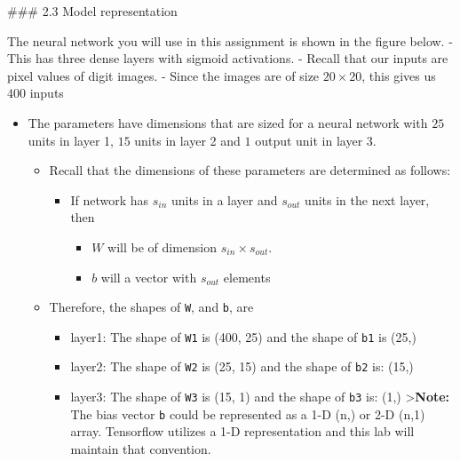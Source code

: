 \documentclass[11pt]{article}
\providecommand{\tightlist}{%
      \setlength{\itemsep}{0pt}\setlength{\parskip}{0pt}}
\begin{document}
    \#\#\# 2.3 Model representation

The neural network you will use in this assignment is shown in the
figure below. - This has three dense layers with sigmoid activations. -
Recall that our inputs are pixel values of digit images. - Since the
images are of size \(20\times20\), this gives us \(400\) inputs

    \begin{itemize}
\item
  The parameters have dimensions that are sized for a neural network
  with \(25\) units in layer 1, \(15\) units in layer 2 and \(1\) output
  unit in layer 3.

  \begin{itemize}
  \tightlist
  \item
    Recall that the dimensions of these parameters are determined as
    follows:

    \begin{itemize}
    \tightlist
    \item
      If network has \(s_{in}\) units in a layer and \(s_{out}\) units
      in the next layer, then

      \begin{itemize}
      \tightlist
      \item
        \(W\) will be of dimension \(s_{in} \times s_{out}\).
      \item
        \(b\) will a vector with \(s_{out}\) elements
      \end{itemize}
    \end{itemize}
  \item
    Therefore, the shapes of \texttt{W}, and \texttt{b}, are

    \begin{itemize}
    \tightlist
    \item
      layer1: The shape of \texttt{W1} is (400, 25) and the shape of
      \texttt{b1} is (25,)
    \item
      layer2: The shape of \texttt{W2} is (25, 15) and the shape of
      \texttt{b2} is: (15,)
    \item
      layer3: The shape of \texttt{W3} is (15, 1) and the shape of
      \texttt{b3} is: (1,) \textgreater{}\textbf{Note:} The bias vector
      \texttt{b} could be represented as a 1-D (n,) or 2-D (n,1) array.
      Tensorflow utilizes a 1-D representation and this lab will
      maintain that convention.
    \end{itemize}
  \end{itemize}
\end{itemize}
\end{document}
